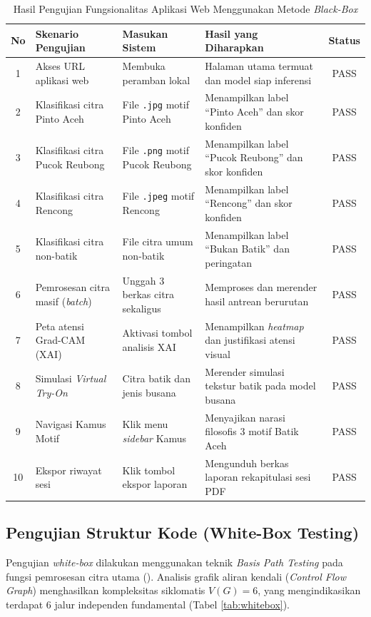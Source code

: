 \documentclass[10pt,a4paper]{article}
\begin{document}
\begin{table}[htbp]
  \centering
  \caption{Hasil Pengujian Fungsionalitas Aplikasi Web Menggunakan Metode \textit{Black-Box}}
  \label{tab:blackbox}
  \fontsize{8pt}{10pt}\selectfont
  \begin{tabularx}{\textwidth}{clXXc}
    \toprule
    \textbf{No} & \textbf{Skenario Pengujian} & \textbf{Masukan Sistem} & \textbf{Hasil yang Diharapkan} & \textbf{Status} \\
    \midrule
    1 & Akses URL aplikasi web & Membuka peramban lokal & Halaman utama termuat dan model siap inferensi & PASS \\
    2 & Klasifikasi citra Pinto Aceh & File \texttt{.jpg} motif Pinto Aceh & Menampilkan label ``Pinto Aceh'' dan skor konfiden & PASS \\
    3 & Klasifikasi citra Pucok Reubong & File \texttt{.png} motif Pucok Reubong & Menampilkan label ``Pucok Reubong'' dan skor konfiden & PASS \\
    4 & Klasifikasi citra Rencong & File \texttt{.jpeg} motif Rencong & Menampilkan label ``Rencong'' dan skor konfiden & PASS \\
    5 & Klasifikasi citra non-batik & File citra umum non-batik & Menampilkan label ``Bukan Batik'' dan peringatan & PASS \\
    6 & Pemrosesan citra masif (\textit{batch}) & Unggah 3 berkas citra sekaligus & Memproses dan merender hasil antrean berurutan & PASS \\
    7 & Peta atensi Grad-CAM (XAI) & Aktivasi tombol analisis XAI & Menampilkan \textit{heatmap} dan justifikasi atensi visual & PASS \\
    8 & Simulasi \textit{Virtual Try-On} & Citra batik dan jenis busana & Merender simulasi tekstur batik pada model busana & PASS \\
    9 & Navigasi Kamus Motif & Klik menu \textit{sidebar} Kamus & Menyajikan narasi filosofis 3 motif Batik Aceh & PASS \\
    10 & Ekspor riwayat sesi & Klik tombol ekspor laporan & Mengunduh berkas laporan rekapitulasi sesi PDF & PASS \\
    \bottomrule
  \end{tabularx}
\end{table}

\subsection{Pengujian Struktur Kode (White-Box Testing)}
Pengujian \textit{white-box} dilakukan menggunakan teknik \textit{Basis Path Testing} pada fungsi pemrosesan citra utama (). Analisis grafik aliran kendali (\textit{Control Flow Graph}) menghasilkan kompleksitas siklomatis $V(G) = 6$, yang mengindikasikan terdapat 6 jalur independen fundamental (Tabel \ref{tab:whitebox}).
\end{document}
